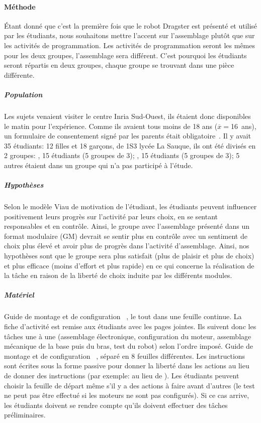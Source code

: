         \paragraph{Méthode}
            Étant donné que c’est la première fois que le robot Dragster est présenté et utilisé par les étudiants, nous souhaitons mettre l’accent sur l’assemblage plutôt que sur les activités de programmation. Les activités de programmation seront les mêmes pour les deux groupes, l’assemblage sera différent. C'est pourquoi les étudiants seront répartis en deux groupes, chaque groupe se trouvant dans une pièce différente.
            \subparagraph{Population}
                Les sujets venaient visiter le centre Inria Sud-Ouest, ils étaient donc disponibles le matin pour l'expérience. Comme ils avaient tous moins de 18 ans ($\overline{x}=$16~ans), un formulaire de consentement signé par les parents était obligatoire~.
                Il y avait 35 étudiants: 12 filles et 18 garçons, de 1\iere S3 lycée La Sauque, ils ont été divisés en 2 groupes: , 15 étudiants (5 groupes de 3); , 15 étudiants (5 groupes de 3); 5 autres étaient dans un groupe qui n'a pas participé à l'étude.
            \subparagraph{Hypothèses}
                Selon le modèle Viau de motivation de l'étudiant, les étudiants peuvent influencer positivement leurs progrès sur l'activité par leurs choix, en se sentant responsables et en contrôle. Ainsi, le groupe avec l'assemblage présenté dans un format modulaire (GM) devrait se sentir plus en contrôle avec un sentiment de choix plus élevé et avoir plus de progrès dans l'activité d'assemblage.
                Ainsi, nos hypothèses sont que le groupe  sera plus satisfait (plus de plaisir et plus de choix) et plus efficace (moins d'effort et plus rapide) en ce qui concerne la réalisation de la tâche en raison de la liberté de choix induite par les différents modules.
            \subparagraph{Matériel}
                Guide de montage et de configuration ~, le tout dans une feuille continue. La fiche d'activité est remise aux étudiants avec les pages jointes. Ils suivent donc les tâches une à une (assemblage électronique, configuration du moteur, assemblage mécanique de la base puis du bras, test du robot) selon l'ordre imposé.
                Guide de montage et de configuration ~, séparé en 8 feuilles différentes. Les instructions sont écrites sous la forme passive pour donner la liberté dans les actions au lieu de donner des instructions (par exemple:  au lieu de ). Les étudiants peuvent choisir la feuille de départ même s'il y a des actions à faire avant d'autres (le test ne peut pas être effectué si les moteurs ne sont pas configurés). Si ce cas arrive, les étudiants doivent se rendre compte qu'ils doivent effectuer des tâches préliminaires.\\
